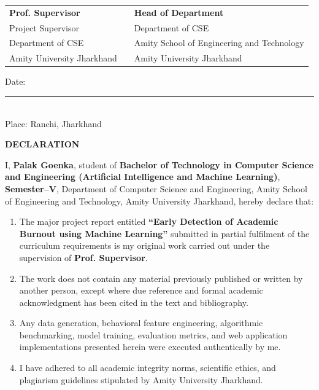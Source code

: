 \documentclass[12pt,a4paper,oneside]{report}
\begin{document}
\noindent
\begin{tabularx}{\textwidth}{XrX}
\textbf{Prof. Supervisor} & & \textbf{Head of Department} \\
Project Supervisor & & Department of CSE \\
Department of CSE & & Amity School of Engineering and Technology \\
Amity University Jharkhand & & Amity University Jharkhand
\end{tabularx}

\vspace{1.8cm}
\noindent
Date: \rule{3.5cm}{0.4pt} \\
Place: Ranchi, Jharkhand

\clearpage

\thispagestyle{plain}
\begin{center}
    {\LARGE \textbf{DECLARATION}}\\[1.0cm]
\end{center}

I, \textbf{Palak Goenka}, student of \textbf{Bachelor of Technology in Computer Science and Engineering (Artificial Intelligence and Machine Learning)}, \textbf{Semester--V}, Department of Computer Science and Engineering, Amity School of Engineering and Technology, Amity University Jharkhand, hereby declare that:

\begin{enumerate}
    \item The major project report entitled \textbf{``Early Detection of Academic Burnout using Machine Learning''} submitted in partial fulfilment of the curriculum requirements is my original work carried out under the supervision of \textbf{Prof. Supervisor}.
    \item The work does not contain any material previously published or written by another person, except where due reference and formal academic acknowledgment has been cited in the text and bibliography.
    \item Any data generation, behavioral feature engineering, algorithmic benchmarking, model training, evaluation metrics, and web application implementations presented herein were executed authentically by me.
    \item I have adhered to all academic integrity norms, scientific ethics, and plagiarism guidelines stipulated by Amity University Jharkhand.
\end{enumerate}
\end{document}
